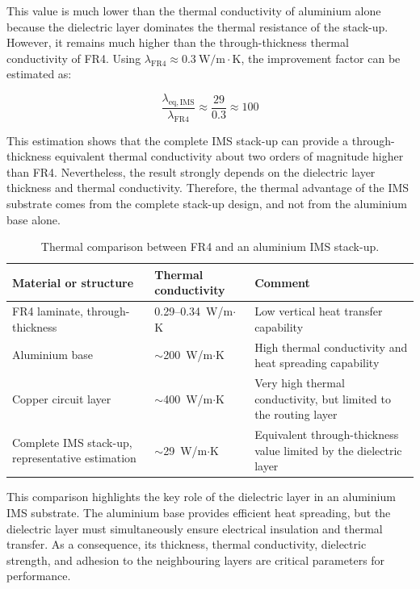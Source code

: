 This value is much lower than the thermal conductivity of aluminium alone because the dielectric layer dominates the thermal resistance of the stack-up. However, it remains much higher than the through-thickness thermal conductivity of FR4. Using \( \lambda_{\mathrm{FR4}} \approx 0.3~\mathrm{W/m\cdot K} \), the improvement factor can be estimated as:

\begin{equation}
\frac{\lambda_{\mathrm{eq,IMS}}}{\lambda_{\mathrm{FR4}}}
\approx
\frac{29}{0.3}
\approx 100
\end{equation}

This estimation shows that the complete IMS stack-up can provide a through-thickness equivalent thermal conductivity about two orders of magnitude higher than FR4. Nevertheless, the result strongly depends on the dielectric layer thickness and thermal conductivity. Therefore, the thermal advantage of the IMS substrate comes from the complete stack-up design, and not from the aluminium base alone.


\begin{table}[H]
    \centering
    \caption{Thermal comparison between FR4 and an aluminium IMS stack-up.}
    \label{tab:fr4_ims_thermal_comparison}
    \begin{tabular}{|p{4.2cm}|p{3.8cm}|p{6.4cm}|}
        \hline
        \textbf{Material or structure} & \textbf{Thermal conductivity} & \textbf{Comment} \\
        \hline
        FR4 laminate, through-thickness & 0.29--0.34~W/m$\cdot$K & Low vertical heat transfer capability \\
        \hline
        Aluminium base & $\sim$200~W/m$\cdot$K & High thermal conductivity and heat spreading capability \\
        \hline
        Copper circuit layer & $\sim$400~W/m$\cdot$K & Very high thermal conductivity, but limited to the routing layer \\
        \hline
        Complete IMS stack-up, representative estimation & $\sim$29~W/m$\cdot$K & Equivalent through-thickness value limited by the dielectric layer \\
        \hline
    \end{tabular}
\end{table}

This comparison highlights the key role of the dielectric layer in an aluminium IMS substrate. The aluminium base provides efficient heat spreading, but the dielectric layer must simultaneously ensure electrical insulation and thermal transfer. As a consequence, its thickness, thermal conductivity, dielectric strength, and adhesion to the neighbouring layers are critical parameters for performance.


